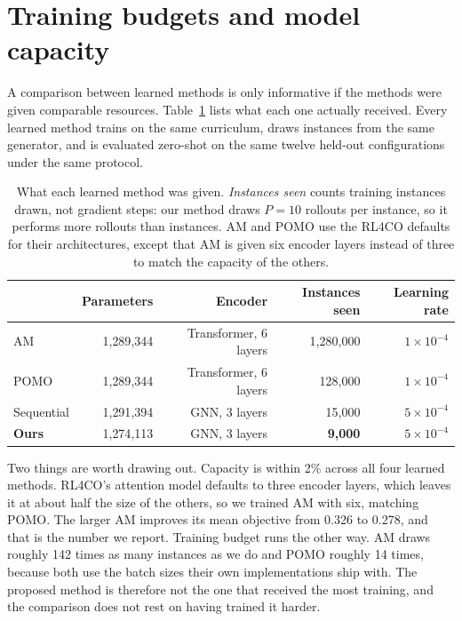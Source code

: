 \section{Training budgets and model capacity}
\label{app:fairness}

A comparison between learned methods is only informative if the methods were
given comparable resources. Table~\ref{tab:fairness} lists what each one
actually received. Every learned method trains on the same curriculum, draws
instances from the same generator, and is evaluated zero-shot on the same
twelve held-out configurations under the same protocol.

\begin{table}[htbp]
\centering
\small
\caption{What each learned method was given. \emph{Instances seen} counts
training instances drawn, not gradient steps: our method draws $P{=}10$
rollouts per instance, so it performs more rollouts than instances. AM and
POMO use the RL4CO defaults for their architectures, except that AM is given
six encoder layers instead of three to match the capacity of the others.}
\label{tab:fairness}
\begin{tabular}{@{}lrrrr@{}}
\toprule
 & Parameters & Encoder & Instances seen & Learning rate \\
\midrule
AM~\cite{kool2018attention}   & 1{,}289{,}344 & Transformer, 6 layers & 1{,}280{,}000 & $1\times10^{-4}$ \\
POMO~\cite{kwon2020pomo}      & 1{,}289{,}344 & Transformer, 6 layers & 128{,}000 & $1\times10^{-4}$ \\
Sequential                    & 1{,}291{,}394 & GNN, 3 layers         & 15{,}000  & $5\times10^{-4}$ \\
\textbf{Ours}                 & 1{,}274{,}113 & GNN, 3 layers         & \textbf{9{,}000} & $5\times10^{-4}$ \\
\bottomrule
\end{tabular}
\end{table}

Two things are worth drawing out. Capacity is within 2\% across all four
learned methods. RL4CO's attention model defaults to three encoder layers,
which leaves it at about half the size of the others, so we trained AM with
six, matching POMO. The larger AM improves its mean objective from 0.326 to
0.278, and that is the number we report. Training budget runs the other way. AM
draws roughly 142 times as many instances as we do and POMO roughly 14 times,
because both use the batch sizes their own implementations ship with. The
proposed method is therefore not the one that received the most training, and
the comparison does not rest on having trained it harder.

